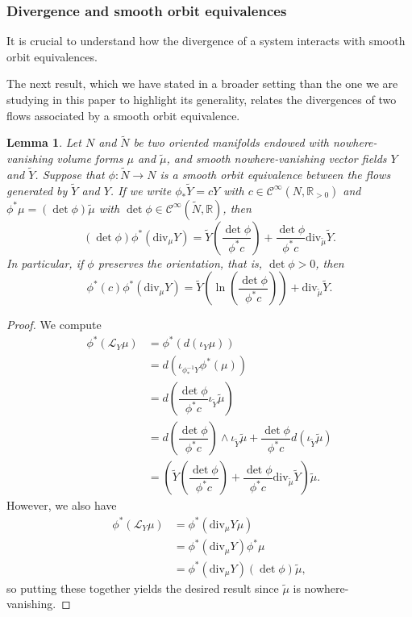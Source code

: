 \documentclass[reqno,12pt,letterpaper]{amsart}
\newtheorem{lemma}[proposition]{Lemma}
\theoremstyle{definition}
\theoremstyle{remark}
\theoremstyle{definition}
\numberwithin{equation}{section}
\newcommand{\R}{\mathbb{R}}
\renewcommand{\div}{\mathrm{div}}
\begin{document}
\subsubsection{Divergence and smooth orbit equivalences}\label{subsubsection:divergence}

It is crucial to understand how the divergence of a system interacts with smooth orbit equivalences. 

The next result, which we have stated in a broader setting than the one we are studying in this paper to highlight its generality, relates the divergences of two flows associated by a smooth orbit equivalence. 
\begin{lemma}\label{lemma:relation-divergences}
Let $N$ and $\widetilde{N}$ be two oriented manifolds endowed with nowhere-vanishing volume forms $\mu$ and $\tilde{\mu}$, and smooth nowhere-vanishing vector fields $Y$ and $\widetilde{Y}$. Suppose that $\phi : \widetilde{N}\to N$ is a smooth orbit equivalence between the flows generated by $\widetilde{Y}$ and $Y$. If we write $\phi_*\widetilde{Y}=cY$ with $c \in \mathcal{C}^\infty(N, \R_{>0})$ and $\phi^*\mu = (\det \phi )\tilde{\mu}$ with $\det \phi\in \mathcal{C}^\infty(\widetilde{N}, \R)$, then $$(\det \phi)\phi^*(\div_\mu Y)=\widetilde{Y}\left(\dfrac{\det \phi}{\phi^*c}\right)+\dfrac{\det \phi}{\phi^*c}\div_{\tilde{\mu}}\widetilde{Y}.$$
In particular, if $\phi$ preserves the orientation, that is, $\det \phi >0$, then  $$\phi^*(c)\phi^*(\div_\mu Y)=\widetilde{Y}\left(\ln \left(\dfrac{\det \phi}{\phi^*c}\right)\right)+\div_{\tilde{\mu}} \widetilde{Y}.$$
\end{lemma}
\begin{proof}
We compute 
\begin{equation*}
\begin{alignedat}{1}
\phi^*(\mathcal{L}_Y \mu)&=\phi^*(d(\iota_Y \mu))\\
&=d(\iota_{\phi^{-1}_* Y} \phi^*(\mu))\\
&=d\left(\dfrac{\det \phi}{\phi^*c}\iota_{\widetilde{Y}} \tilde{\mu}\right)\\
&=d\left(\dfrac{\det \phi}{\phi^*c}\right)\wedge \iota_{\widetilde{Y}} \tilde{\mu}+\dfrac{\det \phi}{\phi^*c}d(\iota_{\widetilde{Y}}\tilde{\mu}) \\
&=\left(\widetilde{Y}\left(\dfrac{\det \phi}{\phi^*c}\right)+\dfrac{\det \phi}{\phi^*c}\div_{\tilde{\mu}}\widetilde{Y}\right)\tilde{\mu}.
\end{alignedat}
\end{equation*}
However, we also have
\begin{equation*}
\begin{alignedat}{1}
\phi^*(\mathcal{L}_Y \mu)&=\phi^*(\div_\mu Y \mu)\\
&=\phi^*(\div_\mu Y)\phi^*\mu\\
&=\phi^* (\div_\mu Y)(\det \phi)\tilde{\mu},
\end{alignedat}
\end{equation*}
so putting these together yields the desired result since $\tilde{\mu}$ is nowhere-vanishing.
\end{proof}
\end{document}
